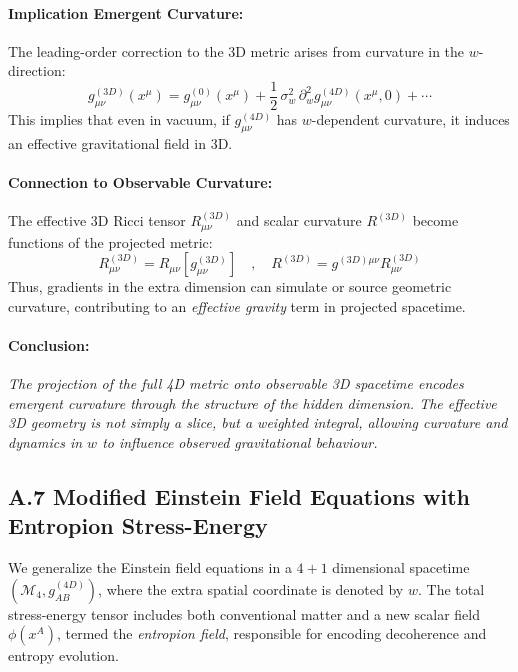 \documentclass[12pt]{article}
\begin{document}
\paragraph{Implication   Emergent Curvature:}
The leading-order correction to the 3D metric arises from curvature in the \(w\)-direction:
\begin{equation}
g^{(3D)}_{\mu\nu}(x^\mu) = g^{(0)}_{\mu\nu}(x^\mu) + \frac{1}{2}\, \sigma_w^2\, \partial_w^2 g^{(4D)}_{\mu\nu}(x^\mu, 0) + \cdots
\end{equation}
This implies that even in vacuum, if \(g^{(4D)}_{\mu\nu}\) has \(w\)-dependent curvature, it induces an effective gravitational field in 3D.

\paragraph{Connection to Observable Curvature:}
The effective 3D Ricci tensor \(R^{(3D)}_{\mu\nu}\) and scalar curvature \(R^{(3D)}\) become functions of the projected metric:
\begin{equation}
R^{(3D)}_{\mu\nu} = R_{\mu\nu}\left[g^{(3D)}_{\mu\nu}\right] \quad,\quad R^{(3D)} = g^{(3D)\mu\nu} R^{(3D)}_{\mu\nu}
\end{equation}
Thus, gradients in the extra dimension can simulate or source geometric curvature, contributing to an \emph{effective gravity} term in projected spacetime.

\paragraph{Conclusion:}
\emph{The projection of the full 4D metric onto observable 3D spacetime encodes emergent curvature through the structure of the hidden dimension. The effective 3D geometry is not simply a slice, but a weighted integral, allowing curvature and dynamics in \(w\) to influence observed gravitational behaviour.}


\subsection*{A.7 \quad Modified Einstein Field Equations with Entropion Stress-Energy}
\label{eq:A7}

We generalize the Einstein field equations in a \(4+1\) dimensional spacetime \((\mathcal{M}_4, g^{(4D)}_{AB})\), where the extra spatial coordinate is denoted by \(w\). The total stress-energy tensor includes both conventional matter and a new scalar field \(\phi(x^A)\), termed the \emph{entropion field}, responsible for encoding decoherence and entropy evolution.
\end{document}
